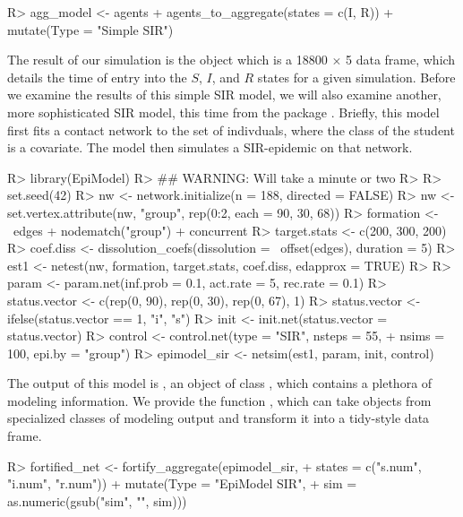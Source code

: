 \documentclass[
  shortnames]{jss}
\begin{document}
\begin{CodeChunk}
\begin{CodeInput}
R> agg_model <- agents %
+   agents_to_aggregate(states = c(I, R)) %
+   mutate(Type = "Simple SIR")
\end{CodeInput}
\end{CodeChunk}

The result of our simulation is the object  which is a
18800 \(\times\) 5 data frame, which details the time of entry into the
\(S\), \(I\), and \(R\) states for a given simulation. Before we examine
the results of this simple SIR model, we will also examine another, more
sophisticated SIR model, this time from the package .
Briefly, this model first fits a contact network to the set of
indivduals, where the class of the student is a covariate. The model
then simulates a SIR-epidemic on that network.

\begin{CodeChunk}
\begin{CodeInput}
R> library(EpiModel)
R> ## WARNING:  Will take a minute or two
R> 
R> set.seed(42)
R> nw <- network.initialize(n = 188, directed = FALSE)
R> nw <- set.vertex.attribute(nw, "group", rep(0:2, each = 90, 30, 68))
R> formation <- ~edges + nodematch("group") + concurrent
R> target.stats <- c(200, 300, 200)
R> coef.diss <- dissolution_coefs(dissolution = ~offset(edges),  duration = 5)
R> est1 <- netest(nw, formation, target.stats, coef.diss, edapprox = TRUE)
R> 
R> param <- param.net(inf.prob = 0.1, act.rate = 5, rec.rate = 0.1)
R> status.vector <- c(rep(0, 90), rep(0, 30), rep(0, 67), 1)
R> status.vector <- ifelse(status.vector == 1, "i", "s")
R> init <- init.net(status.vector = status.vector)
R> control <- control.net(type = "SIR", nsteps = 55,
+                        nsims = 100, epi.by = "group")
R> epimodel_sir <- netsim(est1, param, init, control)
\end{CodeInput}
\end{CodeChunk}

The output of this model is , an object of class
, which contains a plethora of modeling information. We
provide the function , which can take objects
from specialized classes of modeling output and transform it into a
tidy-style data frame.

\begin{CodeChunk}
\begin{CodeInput}
R> fortified_net <- fortify_aggregate(epimodel_sir, 
+                                    states = c("s.num", "i.num", "r.num")) %
+   mutate(Type = "EpiModel SIR",
+          sim = as.numeric(gsub("sim", "", sim)))
\end{CodeInput}
\end{CodeChunk}
\end{document}

